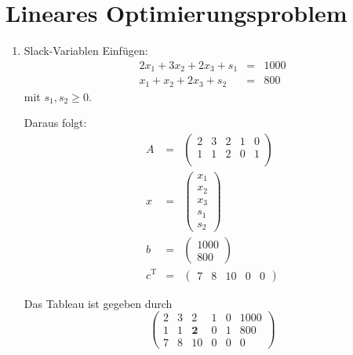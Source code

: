 \documentclass[DIN, pagenumber=false, fontsize=11pt, parskip=half]{scrartcl}
\begin{document}
    \section{Lineares Optimierungsproblem}
    \begin{enumerate}[label=\alph*)]
        \item
            Slack-Variablen Einfügen:
            \begin{eqnarray}
                2 x_1 + 3 x_2 + 2 x_3 + s_1 &=& 1000 \\
                x_1 + x_2 + 2 x_3 + s_2 &=& 800
            \end{eqnarray}
            mit $s_1, s_2 \geq 0$.

            Daraus folgt:
            \begin{eqnarray}
                A &=& \begin{pmatrix}
                    2 & 3 & 2 & 1 & 0 \\
                    1 & 1 & 2 & 0 & 1 \\
                \end{pmatrix} \\
                x &=& \begin{pmatrix}
                    x_1 \\ x_2 \\ x_3 \\ s_1 \\ s_2
                \end{pmatrix} \\
                b &=& \begin{pmatrix}
                    1000 \\ 800
                \end{pmatrix} \\
                c^\text{T} &=& \begin{pmatrix}
                    7 & 8 & 10 & 0 & 0
                \end{pmatrix}
            \end{eqnarray}

            Das Tableau ist gegeben durch
            \begin{equation}
                \begin{pmatrix}
                    2 & 3 & 2 & 1 & 0 & 1000 \\
                    1 & 1 & \mathbf{2} & 0 & 1 & 800  \\
                    7 & 8 & 10 & 0 & 0 & 0
                \end{pmatrix}
            \end{equation} 
            

\end{enumerate}
\end{document}
